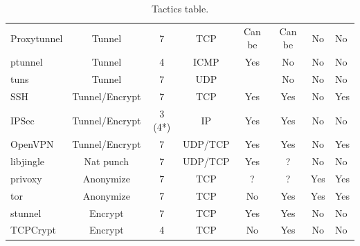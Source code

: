 \begin{table}
\begin{tabular}{|l|c|c|c|c|c|c|p{1.5cm}| }
Proxytunnel & Tunnel            & 7      & TCP         & Can be & Can be & No & No\\
ptunnel     & Tunnel            & 4      & ICMP        & Yes    & No     & No & No\\
tuns        & Tunnel            & 7      & UDP         & &        No     & No & No\\
SSH         & Tunnel/Encrypt & 7      & TCP         & Yes    & Yes    & No & Yes\\
IPSec       & Tunnel/Encrypt & 3 (4*) & IP          & Yes    & Yes    & No & No\\
OpenVPN     & Tunnel/Encrypt & 7      & UDP/TCP     & Yes    & Yes    & No & Yes\\
libjingle   & Nat punch         & 7      & UDP/TCP     & Yes    & ?      & No & No\\
privoxy     & Anonymize         & 7      & TCP         & ?      & ?      & Yes & Yes\\
tor         & Anonymize         & 7      & TCP         & No     & Yes    & Yes & Yes\\
stunnel     & Encrypt        & 7      & TCP         & Yes    & Yes    & No & No\\
TCPCrypt    & Encrypt        & 4      & TCP         & No     & Yes    & No & No\\
\hline
\end{tabular}
\caption{\label{tbl:signpost-tunnels}Tactics table.}
\end{table}

